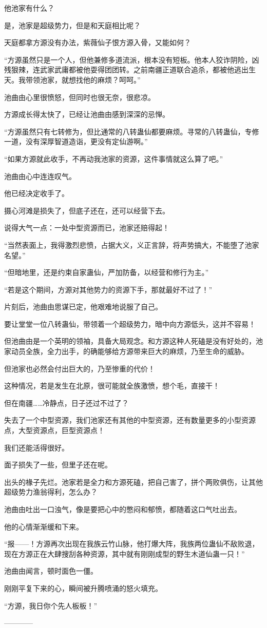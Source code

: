 \begin{this_body}
他池家有什么？

是，池家是超级势力，但是和天庭相比呢？

天庭都拿方源没有办法，紫薇仙子恨方源入骨，又能如何？

“方源虽然只是一个人，但他兼修多道流派，根本没有短板。他本人狡诈阴险，凶残狠辣，连武家武庸都被他耍得团团转。之前南疆正道联合追杀，都被他逃出生天。我带领池家，就想找他的麻烦？呵呵。”

池曲由心里很愤怒，但同时也很无奈，很悲凉。

方源成长得太快了，已经让池曲由感到深深的忌惮。

“方源虽然只有七转修为，但比通常的八转蛊仙都要麻烦。寻常的八转蛊仙，专修一道，没有深厚智道造诣，更没有定仙游啊。”

“如果方源就此收手，不再动我池家的资源，这件事情就这么算了吧。”

池曲由心中连连叹气。

他已经决定收手了。

摄心河滩是损失了，但底子还在，还可以经营下去。

说得大气一点：一处中型资源而已，池家还赔得起！

“当然表面上，我得激烈悲愤，占据大义，义正言辞，将声势搞大，不能堕了池家名望。”

“但暗地里，还是约束自家蛊仙，严加防备，以经营和修行为主。”

“若是这个期间，方源对其他势力的资源下手，那就最好不过了！”

片刻后，池曲由思谋已定，他艰难地说服了自己。

要让堂堂一位八转蛊仙，带领着一个超级势力，暗中向方源低头，这并不容易！

但池曲由是一个英明的领袖，具备大局观念。和方源这种人死磕是没有好处的，池家动员全族，全力出手，的确能够给方源带来巨大的麻烦，乃至生命的威胁。

但池家也必然会付出巨大的，乃至惨重的代价！

这种情况，若是发生在北原，很可能就全族激愤，想个毛，直接干！

但在南疆……冷静点，日子还过不过了？

失去了一个中型资源，我们池家还有其他的中型资源，还有数量更多的小型资源点，大型资源点，巨型资源点！

我们还能活得很好。

面子损失了一些，但里子还在呢。

出头的椽子先烂。池家若是全力和方源死磕，把自己害了，拼个两败俱伤，让其他超级势力渔翁得利，怎么办？

池曲由吐出一口浊气，像是要把心中的憋闷和郁愤，都随着这口气吐出去。

他的心情渐渐缓和下来。

“报——！方源再次出现在我族云竹山脉，他打爆大阵，我族两位蛊仙不敌败退，现在方源正在大肆搜刮各种资源，其中就有刚刚成型的野生木道仙蛊一只！”

池曲由闻言，顿时面色一僵。

刚刚平复下来的心，瞬间被升腾喷涌的怒火填充。

“方源，我日你个先人板板！”

------------

\end{this_body}

